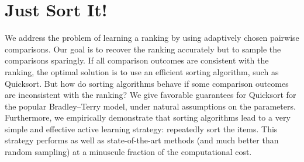 \chapter{Just Sort It!}
\label{ch:robustsort}

We address the problem of learning a ranking by using adaptively chosen pairwise comparisons.
Our goal is to recover the ranking accurately but to sample the comparisons sparingly.
If all comparison outcomes are consistent with the ranking, the optimal solution is to use an efficient sorting algorithm, such as Quicksort.
But how do sorting algorithms behave if some comparison outcomes are inconsistent with the ranking?
We give favorable guarantees for Quicksort for the popular Bradley--Terry model, under natural assumptions on the parameters.
Furthermore, we empirically demonstrate that sorting algorithms lead to a very simple and effective active learning strategy: repeatedly sort the items.
This strategy performs as well as state-of-the-art methods (and much better than random sampling) at a minuscule fraction of the computational cost.










